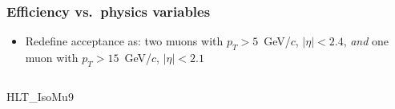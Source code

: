 \documentclass[compress]{beamer}
\begin{document}
\begin{frame}
\frametitle{Efficiency vs.\ physics variables}

\begin{itemize}
\item Redefine acceptance as: two muons with $p_T > 5$~GeV/$c$, $|\eta|
  < 2.4$, {\it and} one muon with $p_T > 15$~GeV/$c$, $|\eta| < 2.1$
\end{itemize}

\begin{center}
\end{center}

\vspace{-0.25 cm}
\begin{columns}
\centering HLT\_IsoMu9



\end{columns}
\end{frame}
\end{document}
